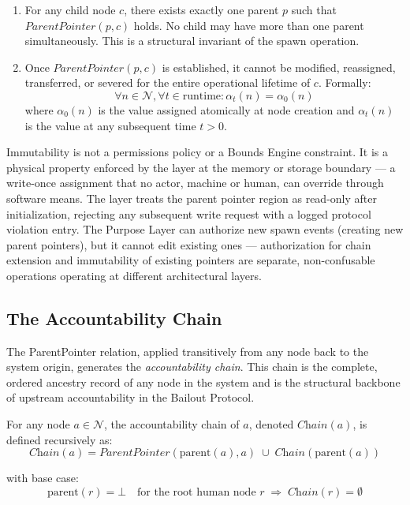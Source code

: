 \begin{enumerate}
\item[\textbf{P1 — Uniqueness:}] For any child node $c$, there exists exactly one parent $p$ such that $\textit{ParentPointer}(p, c)$ holds. No child may have more than one parent simultaneously. This is a structural invariant of the spawn operation.

\item[\textbf{P2 — Immutability:}] Once $\textit{ParentPointer}(p, c)$ is established, it cannot be modified, reassigned, transferred, or severed for the entire operational lifetime of $c$. Formally:
\begin{equation}
\forall n \in \mathcal{N}, \forall t \in \text{runtime}: \alpha_t(n) = \alpha_0(n)
\tag{PP-2}
\end{equation}
where $\alpha_0(n)$ is the value assigned atomically at node creation and $\alpha_t(n)$ is the value at any subsequent time $t > 0$.
\end{enumerate}

Immutability is not a permissions policy or a Bounds Engine constraint. It is a physical property enforced by the \fact{} layer at the memory or storage boundary — a write-once assignment that no actor, machine or human, can override through software means. The \fact{} layer treats the parent pointer region as read-only after initialization, rejecting any subsequent write request with a logged protocol violation entry. The Purpose Layer can authorize new spawn events (creating new parent pointers), but it cannot edit existing ones — authorization for chain extension and immutability of existing pointers are separate, non-confusable operations operating at different architectural layers.

\subsection{The Accountability Chain}

The ParentPointer relation, applied transitively from any node back to the system origin, generates the \emph{accountability chain}. This chain is the complete, ordered ancestry record of any node in the system and is the structural backbone of upstream accountability in the Bailout Protocol.

\begin{definition}
\label{def:chain}
For any node $a \in \mathcal{N}$, the accountability chain of $a$, denoted $\textit{Chain}(a)$, is defined recursively as:
\begin{equation}
\textit{Chain}(a) = \textit{ParentPointer}(\text{parent}(a), a) \;\cup\; \textit{Chain}(\text{parent}(a))
\tag{CH-1}
\end{equation}

\noindent with base case:
\begin{equation}
\text{parent}(r) = \bot \quad \text{for the root human node } r \;\Rightarrow\; \textit{Chain}(r) = \emptyset
\tag{CH-2}
\end{equation}
\end{definition}

